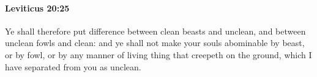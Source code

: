 
		\paragraph{Leviticus 20:25} %
			\label{LEVITICUS-20-25}

			Ye shall therefore put difference between clean beasts and unclean, and between unclean fowls and clean: and ye shall not make your souls abominable by beast, or by fowl, or by any manner of living thing that creepeth on the ground, which I have separated from you as unclean.


